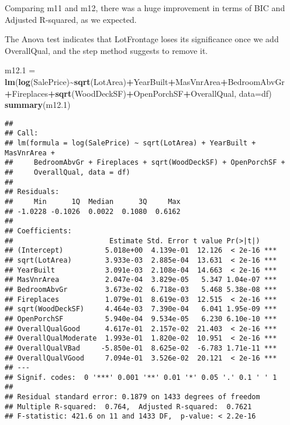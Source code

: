 \documentclass[
]{article}
\newenvironment{Shaded}{\begin{snugshade}}{\end{snugshade}}
\newcommand{\AttributeTok}[1]{\textcolor[rgb]{0.13,0.29,0.53}{#1}}
\newcommand{\FloatTok}[1]{\textcolor[rgb]{0.00,0.00,0.81}{#1}}
\newcommand{\FunctionTok}[1]{\textcolor[rgb]{0.13,0.29,0.53}{\textbf{#1}}}
\newcommand{\NormalTok}[1]{#1}
\newcommand{\OtherTok}[1]{\textcolor[rgb]{0.56,0.35,0.01}{#1}}
\newcommand{\SpecialCharTok}[1]{\textcolor[rgb]{0.81,0.36,0.00}{\textbf{#1}}}
\begin{document}
Comparing m11 and m12, there was a huge improvement in terms of BIC and
Adjusted R-squared, as we expected.

The Anova test indicates that LotFrontage loses its significance once we
add OverallQual, and the step method suggests to remove it.

\begin{Shaded}
\begin{Highlighting}[]
\NormalTok{m12}\FloatTok{.1} \OtherTok{=} \FunctionTok{lm}\NormalTok{(}\FunctionTok{log}\NormalTok{(SalePrice)}\SpecialCharTok{\textasciitilde{}}\FunctionTok{sqrt}\NormalTok{(LotArea)}\SpecialCharTok{+}\NormalTok{YearBuilt}\SpecialCharTok{+}\NormalTok{MasVnrArea}\SpecialCharTok{+}\NormalTok{BedroomAbvGr}
           \SpecialCharTok{+}\NormalTok{Fireplaces}\SpecialCharTok{+}\FunctionTok{sqrt}\NormalTok{(WoodDeckSF)}\SpecialCharTok{+}\NormalTok{OpenPorchSF}\SpecialCharTok{+}\NormalTok{OverallQual, }\AttributeTok{data=}\NormalTok{df)}
\FunctionTok{summary}\NormalTok{(m12}\FloatTok{.1}\NormalTok{)}
\end{Highlighting}
\end{Shaded}

\begin{verbatim}
## 
## Call:
## lm(formula = log(SalePrice) ~ sqrt(LotArea) + YearBuilt + MasVnrArea + 
##     BedroomAbvGr + Fireplaces + sqrt(WoodDeckSF) + OpenPorchSF + 
##     OverallQual, data = df)
## 
## Residuals:
##     Min      1Q  Median      3Q     Max 
## -1.0228 -0.1026  0.0022  0.1080  0.6162 
## 
## Coefficients:
##                       Estimate Std. Error t value Pr(>|t|)    
## (Intercept)          5.018e+00  4.139e-01  12.126  < 2e-16 ***
## sqrt(LotArea)        3.933e-03  2.885e-04  13.631  < 2e-16 ***
## YearBuilt            3.091e-03  2.108e-04  14.663  < 2e-16 ***
## MasVnrArea           2.047e-04  3.829e-05   5.347 1.04e-07 ***
## BedroomAbvGr         3.673e-02  6.718e-03   5.468 5.38e-08 ***
## Fireplaces           1.079e-01  8.619e-03  12.515  < 2e-16 ***
## sqrt(WoodDeckSF)     4.464e-03  7.390e-04   6.041 1.95e-09 ***
## OpenPorchSF          5.940e-04  9.534e-05   6.230 6.10e-10 ***
## OverallQualGood      4.617e-01  2.157e-02  21.403  < 2e-16 ***
## OverallQualModerate  1.993e-01  1.820e-02  10.951  < 2e-16 ***
## OverallQualVBad     -5.850e-01  8.625e-02  -6.783 1.71e-11 ***
## OverallQualVGood     7.094e-01  3.526e-02  20.121  < 2e-16 ***
## ---
## Signif. codes:  0 '***' 0.001 '**' 0.01 '*' 0.05 '.' 0.1 ' ' 1
## 
## Residual standard error: 0.1879 on 1433 degrees of freedom
## Multiple R-squared:  0.764,  Adjusted R-squared:  0.7621 
## F-statistic: 421.6 on 11 and 1433 DF,  p-value: < 2.2e-16
\end{verbatim}
\end{document}
